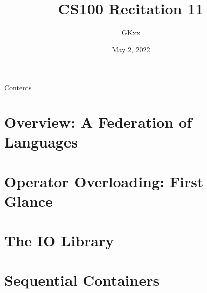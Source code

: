 \documentclass{beamer}
\title{CS100 Recitation 11}
\author{GKxx}
\date{May 2, 2022}
\begin{document}
\begin{frame}
    \maketitle
\end{frame}

\begin{frame}{Contents}
    \tableofcontents
\end{frame}

\section{Overview: A Federation of Languages}



\section{Operator Overloading: First Glance}



\section{The IO Library}



\section{Sequential Containers}


\end{document}
